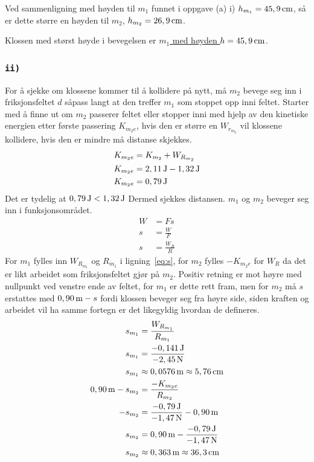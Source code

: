 \documentclass{article}
\let\oldsubsubsection\subsubsection
\renewcommand{\subsubsection}[1]{%
  \oldsubsubsection{\texttt{#1}}%
}
\begin{document}
Ved sammenligning med høyden til \(m_1\) funnet i oppgave (a) i) \(h_{m_1} = \unit[45,9]{cm}\), så er dette større en høyden til \(m_2\), \(h_{m_2} = \unit[26,9]{cm}\). \par
Klossen med størst høyde i bevegelsen er \underline{\underline{\(m_1\) med høyden \(h = \unit[45,9]{cm}\)}}.

\clearpage
\subsubsection{ii)}
For å sjekke om klossene kommer til å kollidere på nytt, må \(m_2\) bevege seg inn i friksjonsfeltet \(d\) såpass langt at den treffer \(m_1\) som stoppet opp inni feltet. Starter med å finne ut om \(m_2\) passerer feltet eller stopper inni med hjelp av den kinetiske energien etter første passering \(K_{m_2e}\), hvis den er større en \(W_{r_{m_2}}\) vil klossene kollidere, hvis den er mindre må distanse skjekkes.
\begin{equation*}
\begin{split}
    K_{m_2e} &= K_{m_2} + W_{R_{m_2}} \\
    K_{m_2e} &= \unit[2,11]{J} - \unit[1,32]{J} \\
    K_{m_2e} &= \unit[0,79]{J}\\
\end{split}
\end{equation*}
Det er tydelig at \(\unit[0,79]{J} < \unit[1,32]{J}\) Dermed sjekkes distansen. \(m_1\) og \(m_2\) beveger seg inn i funksjonsområdet.
\begin{equation}
\begin{split}
    W &= F s \\
    s &= \frac{W}{F} \\
    s &= \frac{W_R}{R}
\end{split}
\label{eq:s}
\end{equation}
For \(m_1\) fylles inn \(W_{R_{m_1}}\) og \(R_{m_1}\) i ligning~\ref{eq:s}, for \(m_2\) fylles \(-K_{m_2e}\) for \(W_R\) da det er likt arbeidet som friksjonsfeltet gjør på \(m_2\). Positiv retning er mot høyre med nullpunkt ved venstre ende av feltet, for \(m_1\) er dette rett fram, men for \(m_2\) må \(s\) erstattes med \(\unit[0,90]{m} - s\) fordi klossen beveger seg fra høyre side, siden kraften og arbeidet vil ha samme fortegn er det likegyldig hvordan de defineres.
\begin{equation*}
\begin{split}
    s_{m_1} &= \frac{W_{R_{m_1}}}{R_{m_1}} \\
    s_{m_1} &= \frac{\unit[-0,141]{J}}{\unit[-2,45]{N}} \\
    s_{m_1} &\approx \unit[0,0576]{m} \approx \unit[5,76]{cm} \\
    \unit[0,90]{m} - s_{m_2} &= \frac{-K_{m_2e}}{R_{m_2}} \\
    - s_{m_2} &= \frac{\unit[-0,79]{J}}{\unit[-1,47]{N}} - \unit[0,90]{m} \\
    s_{m_2} &= \unit[0,90]{m} - \frac{\unit[-0,79]{J}}{\unit[-1,47]{N}} \\
    s_{m_2} &\approx \unit[0,363]{m} \approx \unit[36,3]{cm}
\end{split}
\end{equation*}
\end{document}
